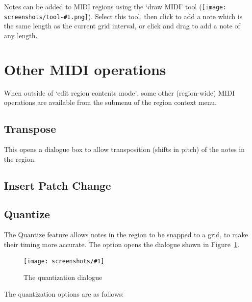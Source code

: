 \documentclass[10pt,a4paper]{book}
\newcommand{\menu}[1]{\emph{\StrSubstitute{#1}{,}{ $\rightarrow$ }}}
\newcommand{\todo}[1]{\marginpar{\small\texttt{#1}}}
\newcommand{\screenshot}[3]{%
\begin{figure}[ht]%
\begin{center}
\texttt{[image: screenshots/\#1]}
\end{center}
\caption{#2}
\label{#3}
\end{figure}}
\newcommand{\inlinetool}[1]{\texttt{[image: screenshots/tool-\#1.png]}}
\begin{document}
Notes can be added to MIDI regions using the `draw MIDI' tool
(\inlinetool{draw-midi}).  Select this tool, then click
to add a note which is the same length as the current grid interval,
or click and drag to add a note of any length.


\section{Other MIDI operations}

When outside of `edit region contents mode', some other (region-wide)
MIDI operations are available from the \menu{MIDI} submenu of the
region context menu.

\subsection{Transpose}

This opens a dialogue box to allow transposition (shifts in pitch) of
the notes in the region.

\subsection{Insert Patch Change}

\todo{hmm}

\subsection{Quantize}

The Quantize feature allows notes in the region to be snapped to a
grid, to make their timing more accurate.  The \menu{Quantize\ldots}
option opens the dialogue shown in Figure~\ref{fig:quantize}.

\screenshot{quantize.png}{The quantization dialogue}{fig:quantize}

The quantization options are as follows:
\end{document}
